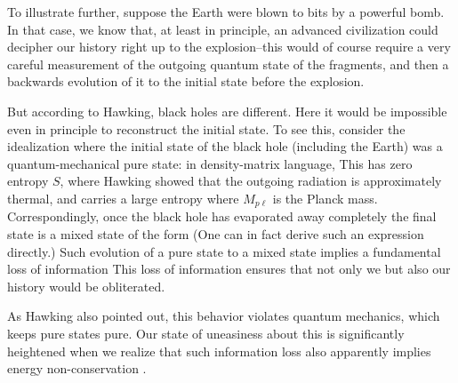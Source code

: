 To illustrate further, suppose the Earth were
blown to bits by a powerful
bomb. In that case, we know that, at least in principle, an advanced
civilization could decipher our history right up to the explosion--this
would of course require a very careful measurement of the outgoing
quantum state of the fragments, and then a backwards evolution of it to
the initial state before the explosion.

But according to Hawking, black holes are different. Here it would be
impossible even in principle to reconstruct the initial state. To see
this, consider the idealization where the initial state of the black
hole (including the Earth) was a quantum-mechanical pure state: in
density-matrix language,
%
\eqn{}
%
This has zero entropy ${S}$, where
%
\eqn{}
%
Hawking showed that the outgoing radiation is approximately thermal, and
carries a large entropy
%
\eqn{}
%
where ${M_{p\ell}}$ is the Planck mass. Correspondingly, once the black
hole has evaporated away completely the final state is a mixed state of
the form
%
\eqn{}
%
(One can in fact derive such an expression directly\Hawk.)
Such evolution of a pure state to a mixed state implies a fundamental
loss of information
%
\eqn{}
%
This loss of information ensures that not only we but also our history
would be obliterated.

As Hawking also pointed out, this behavior violates quantum mechanics,
which keeps pure states pure. Our state of
uneasiness about this is significantly
heightened when we realize that such information loss also apparently
implies energy non-conservation .


